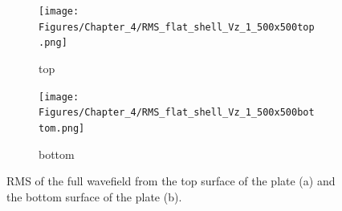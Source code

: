 \begin{figure} [h!]
	\centering
	\begin{subfigure}[b]{0.47\textwidth}
		\centering
		\texttt{[image: Figures/Chapter\_4/RMS\_flat\_shell\_Vz\_1\_500x500top.png]}
		\caption{top}
		\label{fig:rmstop}
	\end{subfigure}
	\hfill
	\begin{subfigure}[b]{0.47\textwidth}
		\centering
		\texttt{[image: Figures/Chapter\_4/RMS\_flat\_shell\_Vz\_1\_500x500bottom.png]}
		\caption{bottom}
		\label{fig:rmsbottom}
	\end{subfigure}
	\caption{RMS of the full wavefield from the top surface of the plate (a) and the bottom surface of the plate (b).}
	\label{fig:rms}
\end{figure} 
\newpage